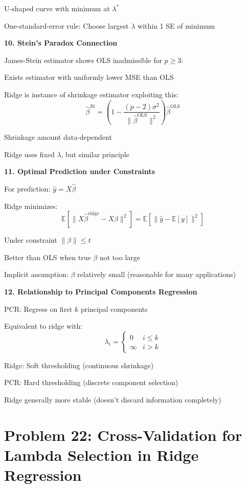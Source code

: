 \documentclass[12pt]{article}
\begin{document}
\begin{explanation}
U-shaped curve with minimum at $\lambda^*$

One-standard-error rule: Choose largest $\lambda$ within 1 SE of minimum

\textbf{10. Stein's Paradox Connection}

James-Stein estimator shows OLS inadmissible for $p \geq 3$:

Exists estimator with uniformly lower MSE than OLS

Ridge is instance of shrinkage estimator exploiting this:
\[\hat{\beta}^{\text{JS}} = \left(1 - \frac{(p-2)\sigma^2}{\|\hat{\beta}^{\text{OLS}}\|^2}\right)\hat{\beta}^{\text{OLS}}\]

Shrinkage amount data-dependent

Ridge uses fixed $\lambda$, but similar principle

\textbf{11. Optimal Prediction under Constraints}

For prediction: $\hat{y} = X\hat{\beta}$

Ridge minimizes:
\[\mathbb{E}[\|X\hat{\beta}^{\text{ridge}} - X\beta\|^2] = \mathbb{E}[\|\hat{y} - \mathbb{E}[y]\|^2]\]

Under constraint $\|\beta\| \leq t$

Better than OLS when true $\beta$ not too large

Implicit assumption: $\beta$ relatively small (reasonable for many applications)

\textbf{12. Relationship to Principal Components Regression}

PCR: Regress on first $k$ principal components

Equivalent to ridge with:
\[\lambda_i = \begin{cases} 0 & i \leq k \\ \infty & i > k \end{cases}\]

Ridge: Soft thresholding (continuous shrinkage)

PCR: Hard thresholding (discrete component selection)

Ridge generally more stable (doesn't discard information completely)

\end{explanation}


\section{Problem 22: Cross-Validation for Lambda Selection in Ridge Regression}
\end{document}
